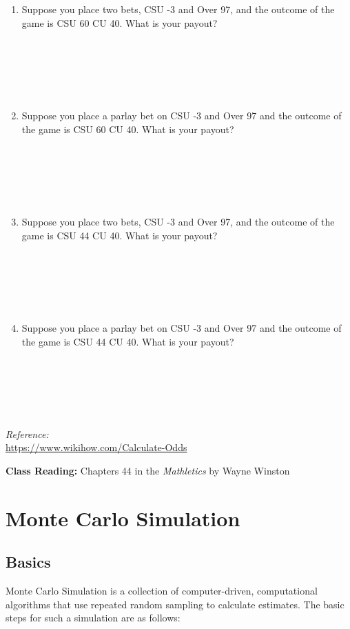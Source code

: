 \documentclass[
  11pt,
]{book}
\theoremstyle{definition}
\theoremstyle{definition}
\theoremstyle{definition}
\theoremstyle{definition}
\theoremstyle{remark}
\begin{document}
\begin{enumerate}
\def\labelenumi{(\alph{enumi})}
\item
  Suppose you place two bets, CSU -3 and Over 97, and the outcome of the game is CSU 60 CU 40. What is your payout?\\
  \strut \\
  \strut \\
  \strut \\
  \vfill
\item
  Suppose you place a parlay bet on CSU -3 and Over 97 and the outcome of the game is CSU 60 CU 40. What is your payout?\\
  \strut \\
  \strut \\
  \strut \\
  \vfill
\item
  Suppose you place two bets, CSU -3 and Over 97, and the outcome of the game is CSU 44 CU 40. What is your payout?\\
  \strut \\
  \strut \\
  \strut \\
  \vfill
\item
  Suppose you place a parlay bet on CSU -3 and Over 97 and the outcome of the game is CSU 44 CU 40. What is your payout?\\
  \strut \\
  \strut \\
  \strut \\
  \vfill
\end{enumerate}

\emph{Reference:}\\
\url{https://www.wikihow.com/Calculate-Odds}

\textbf{Class Reading:} Chapters 44 in the \emph{Mathletics} by Wayne Winston

\hypertarget{monte-carlo-simulation}{%
\chapter{Monte Carlo Simulation}\label{monte-carlo-simulation}}

\hypertarget{basics}{%
\section{Basics}\label{basics}}

Monte Carlo Simulation is a collection of computer-driven, computational algorithms that use repeated random sampling to calculate estimates. The basic steps for such a simulation are as follows:
\end{document}
